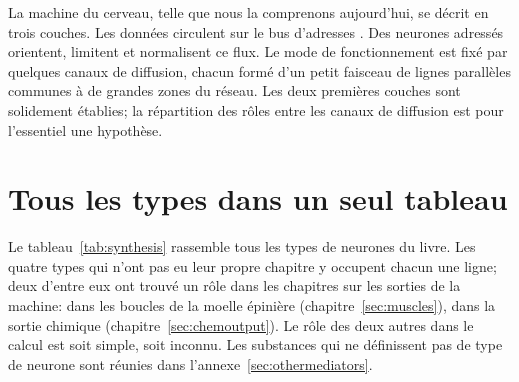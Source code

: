 \begin{keyblock}
\begin{proposition}[Architecture]
\label{prop:architecture}
La machine du cerveau, telle que nous la comprenons aujourd'hui, se décrit en trois couches. Les données circulent sur le bus d'adresses . Des neurones  adressés orientent, limitent et normalisent ce flux. Le mode de fonctionnement est fixé par quelques canaux de diffusion, chacun formé d'un petit faisceau de lignes parallèles communes à de grandes zones du réseau. Les deux premières couches sont solidement établies; la répartition des rôles entre les canaux de diffusion est pour l'essentiel une hypothèse.
\end{proposition}
\end{keyblock}

\section{Tous les types dans un seul tableau}

Le tableau~\ref{tab:synthesis} rassemble tous les types de neurones du livre. Les quatre types qui n'ont pas eu leur propre chapitre y occupent chacun une ligne; deux d'entre eux ont trouvé un rôle dans les chapitres sur les sorties de la machine:  dans les boucles de la moelle épinière (chapitre~\ref{sec:muscles}),  dans la sortie chimique (chapitre~\ref{sec:chemoutput}). Le rôle des deux autres dans le calcul est soit simple, soit inconnu. Les substances qui ne définissent pas de type de neurone sont réunies dans l'annexe~\ref{sec:othermediators}.

